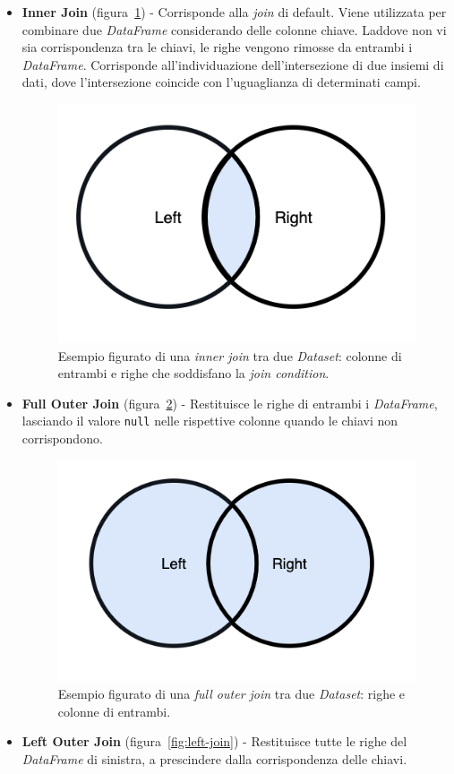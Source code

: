 \begin{itemize}
    \item \textbf{Inner Join} (figura~\ref{fig:inner-join}) - Corrisponde alla \textit{join} di default.
    Viene utilizzata per combinare due \textit{DataFrame} considerando delle colonne chiave.
    Laddove non vi sia corrispondenza tra le chiavi, le righe vengono rimosse da entrambi i \textit{DataFrame}.
    Corrisponde all'individuazione dell'intersezione di due insiemi di dati, dove l'intersezione coincide con l'uguaglianza di determinati campi.
    \begin{figure}[H]
        \includegraphics[width=.5\textwidth]{img/inner-join.png}
        \centering
        \caption{Esempio figurato di una \textit{inner join} tra due \textit{Dataset}: colonne di entrambi e righe che soddisfano la \textit{join condition}.}
        \label{fig:inner-join}
    \end{figure}
    \item \textbf{Full Outer Join} (figura~\ref{fig:outer-join}) - Restituisce le righe di entrambi i \textit{DataFrame}, lasciando il valore \texttt{null} nelle rispettive colonne quando le chiavi non corrispondono.
    \begin{figure}[H]
        \includegraphics[width=.5\textwidth]{img/outer-join.png}
        \centering
        \caption{Esempio figurato di una \textit{full outer join} tra due \textit{Dataset}: righe e colonne di entrambi.}
        \label{fig:outer-join}
    \end{figure}
    \item \textbf{Left Outer Join} (figura~\ref{fig:left-join}) - Restituisce tutte le righe del \textit{DataFrame} di sinistra, a prescindere dalla corrispondenza delle chiavi.

\end{itemize}
